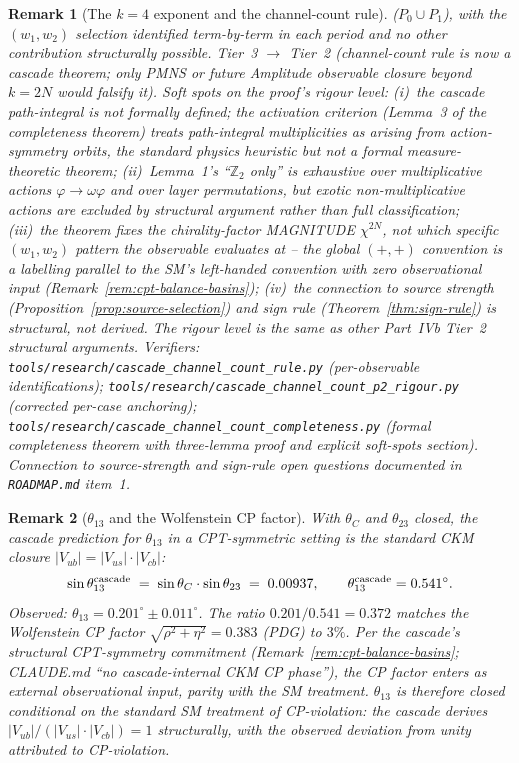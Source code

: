 \documentclass[12pt,a4paper]{article}
\newtheorem*{remark}{Remark}
\begin{document}
\begin{remark}[The $k=4$ exponent and the channel-count rule]
($P_0\cup P_1$), with the $(w_1, w_2)$ selection identified term-by-term in each period and no other contribution structurally possible. Tier~3 $\to$ Tier~2 (channel-count rule is now a cascade theorem; only PMNS or future Amplitude observable closure beyond $k=2N$ would falsify it). \emph{Soft spots on the proof's rigour level:} (i)~the cascade path-integral is not formally defined; the activation criterion (Lemma~3 of the completeness theorem) treats path-integral multiplicities as arising from action-symmetry orbits, the standard physics heuristic but not a formal measure-theoretic theorem; (ii)~Lemma~1's ``$\mathbb{Z}_2$ only'' is exhaustive over multiplicative actions $\varphi\to\omega\varphi$ and over layer permutations, but exotic non-multiplicative actions are excluded by structural argument rather than full classification; (iii)~the theorem fixes the chirality-factor MAGNITUDE $\chi^{2N}$, not which specific $(w_1, w_2)$ pattern the observable evaluates at -- the global $(+, +)$ convention is a labelling parallel to the SM's left-handed convention with zero observational input (Remark~\ref{rem:cpt-balance-basins}); (iv)~the connection to source strength (Proposition~\ref{prop:source-selection}) and sign rule (Theorem~\ref{thm:sign-rule}) is structural, not derived. The rigour level is the same as other Part~IVb Tier~2 structural arguments. Verifiers: \texttt{tools/research/cascade\_channel\_count\_rule.py} (per-observable identifications); \texttt{tools/research/cascade\_channel\_count\_p2\_rigour.py} (corrected per-case anchoring); \texttt{tools/research/cascade\_channel\_count\_completeness.py} (formal completeness theorem with three-lemma proof and explicit soft-spots section). Connection to source-strength and sign-rule open questions documented in \texttt{ROADMAP.md} item~1.
\end{remark}

\begin{remark}[$\theta_{13}$ and the Wolfenstein CP factor]\label{rem:theta13-cp}
With $\theta_C$ and $\theta_{23}$ closed, the cascade prediction for $\theta_{13}$ in a CPT-symmetric setting is the standard CKM closure $|V_{ub}| = |V_{us}|\cdot|V_{cb}|$:
\[
\sin\theta_{13}^{\rm cascade} \;=\; \sin\theta_C\cdot\sin\theta_{23} \;=\; 0.00937, \qquad \theta_{13}^{\rm cascade} = 0.541^\circ.
\]
Observed: $\theta_{13} = 0.201^\circ \pm 0.011^\circ$. The ratio $0.201/0.541 = 0.372$ matches the Wolfenstein CP factor $\sqrt{\rho^2+\eta^2} = 0.383$ (PDG) to $3\%$. Per the cascade's structural CPT-symmetry commitment (Remark~\ref{rem:cpt-balance-basins}; CLAUDE.md ``no cascade-internal CKM CP phase''), the CP factor enters as external observational input, parity with the SM treatment. $\theta_{13}$ is therefore closed conditional on the standard SM treatment of CP-violation: the cascade derives $|V_{ub}|/(|V_{us}|\cdot|V_{cb}|) = 1$ structurally, with the observed deviation from unity attributed to CP-violation.
\end{remark}
\end{document}
